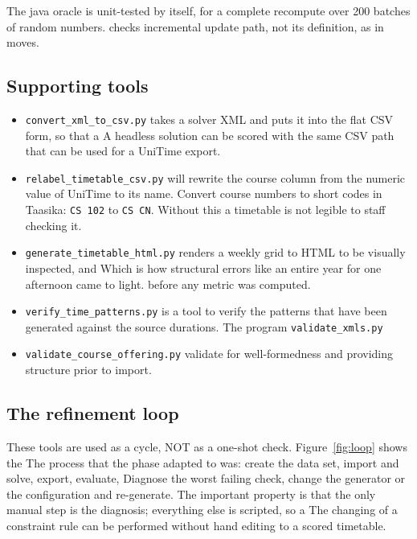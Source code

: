 The java oracle is unit-tested by itself, for a complete recompute over 200 batches of random numbers.
checks incremental update path, not its definition, as in moves.

\subsection{Supporting tools}

\begin{itemize}
  \item \texttt{convert\_xml\_to\_csv.py} takes a solver XML and puts it into the flat CSV form, so that a
    A headless solution can be scored with the same CSV path that can be used for a UniTime export.
  \item \texttt{relabel\_timetable\_csv.py} will rewrite the course column from the numeric value of UniTime to its name.
    Convert course numbers to short codes in Taasika: \texttt{CS 102} to \texttt{CS CN}. Without
    this a timetable is not legible to staff checking it.
  \item \texttt{generate\_timetable\_html.py} renders a weekly grid to HTML to be visually inspected, and
    Which is how structural errors like an entire year for one afternoon came to light.
    before any metric was computed.
  \item \texttt{verify\_time\_patterns.py} is a tool to verify the patterns that have been generated against the source durations.
  The program \texttt{validate\_xmls.py} 
  \item \texttt{validate\_course\_offering.py} validate for well-formedness
    and providing structure prior to import.
\end{itemize}

\subsection{The refinement loop}

These tools are used as a cycle, NOT as a one-shot check. Figure~\ref{fig:loop} shows the
The process that the phase adapted to was: create the data set, import and solve, export, evaluate,
Diagnose the worst failing check, change the generator or the configuration and re-generate. The
important property is that the only manual step is the diagnosis; everything else is scripted, so a
The changing of a constraint rule can be performed without hand editing to a scored timetable.

